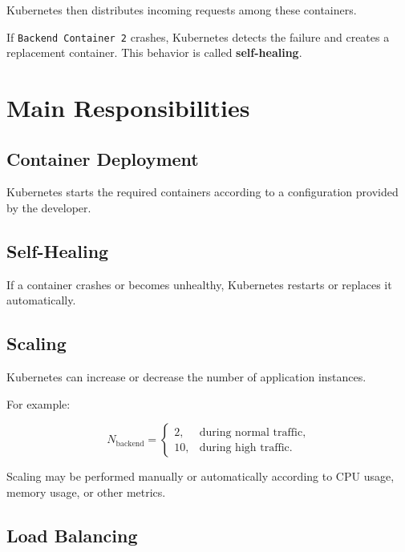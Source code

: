 \documentclass[a4paper]{article}
\begin{document}
        Kubernetes then distributes incoming requests among these containers.
        
        If \texttt{Backend Container 2} crashes, Kubernetes detects the failure and
        creates a replacement container. This behavior is called
        \textbf{self-healing}.
    
    
    \section{Main Responsibilities}
        
        \subsection{Container Deployment}
            
            Kubernetes starts the required containers according to a configuration
            provided by the developer.
        
        \subsection{Self-Healing}
            
            If a container crashes or becomes unhealthy, Kubernetes restarts or replaces
            it automatically.
        
        \subsection{Scaling}
            
            Kubernetes can increase or decrease the number of application instances.
            
            For example:
            
            \[
                N_{\text{backend}} =
                \begin{cases}
                    2, & \text{during normal traffic},\\
                    10, & \text{during high traffic}.
                \end{cases}
            \]
            
            Scaling may be performed manually or automatically according to CPU usage,
            memory usage, or other metrics.
        
        \subsection{Load Balancing}
            
\end{document}
